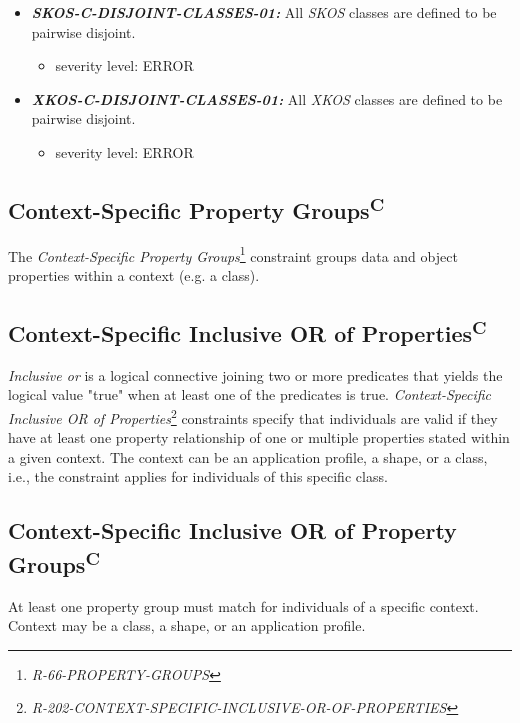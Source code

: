 \documentclass{llncs}
\begin{document}
\begin{itemize}
	\item \textbf{{\em SKOS-C-DISJOINT-CLASSES-01:}} 
All \emph{SKOS} classes are defined to be pairwise disjoint.
\begin{itemize}
		\item severity level: ERROR
	\end{itemize}
\end{itemize}

\begin{itemize}
	\item \textbf{{\em XKOS-C-DISJOINT-CLASSES-01:}} 
All \emph{XKOS} classes are defined to be pairwise disjoint.
\begin{itemize}
		\item severity level: ERROR
	\end{itemize}
\end{itemize}

\subsection{Context-Specific Property Groups\textsuperscript{C}}

The \emph{Context-Specific Property Groups}\footnote{\emph{R-66-PROPERTY-GROUPS}} constraint groups data and object properties within a context (e.g. a class).

\subsection{Context-Specific Inclusive OR of Properties\textsuperscript{C}}

\emph{Inclusive or} is a logical connective joining two or more predicates that yields the logical value "true" when at least one of the predicates is true.
\emph{Context-Specific Inclusive OR of Properties}\footnote{\emph{R-202-CONTEXT-SPECIFIC-INCLUSIVE-OR-OF-PROPERTIES}} constraints specify that individuals are valid if they have at least one property relationship of one or multiple properties stated within a given context.
The context can be an application profile, a shape, or a class, i.e., the constraint applies for individuals of this specific class.

\subsection{Context-Specific Inclusive OR of Property Groups\textsuperscript{C}}

At least one property group must match for individuals of a specific context. 
Context may be a class, a shape, or an application profile.
\end{document}
